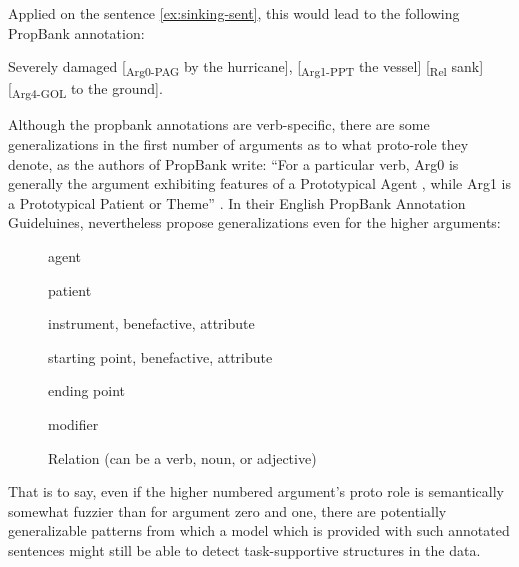 Applied on the sentence  \ref{ex:sinking-sent}, this would lead to the following PropBank annotation:

\begin{examples}
  \item Severely damaged [\textsubscript{Arg0-PAG} by the hurricane], [\textsubscript{Arg1-PPT} the vessel] [\textsubscript{Rel} sank] [\textsubscript{Arg4-GOL} to the ground].
\end{examples}


Although the propbank annotations are verb-specific, there are some generalizations in the first
number of arguments as to what proto-role they denote, as the authors of PropBank write: ``For
a particular verb, Arg0 is generally the argument exhibiting features of a Prototypical Agent
\textelp{}, while Arg1 is a Prototypical Patient or Theme'' \citep[p.~75]{palmer2005proposition}.
In their English PropBank Annotation Guideluines, \cite{bonial2012english} nevertheless propose
generalizations even for the higher arguments:

\begin{description}
  \item[] agent
  \item[] patient
  \item[] instrument, benefactive, attribute
  \item[] starting point, benefactive, attribute
  \item[] ending point
  \item[] modifier
  \item[] Relation (can be a verb, noun, or adjective)
\end{description}

That is to say, even if the higher numbered argument's proto role is semantically somewhat
fuzzier than for argument zero and one, there are potentially generalizable patterns from
which a model which is provided with such annotated sentences might still be able to detect
task-supportive structures in the data.


